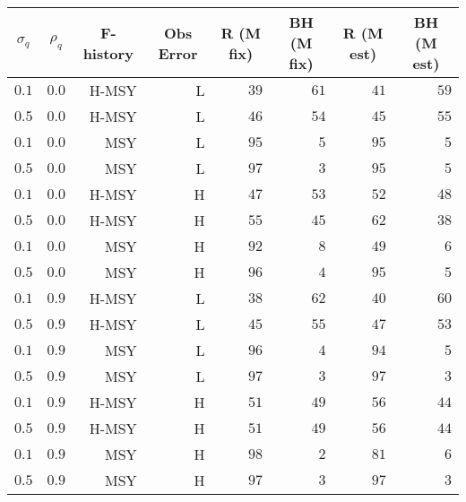 \begin{center}
\begin{tabular}{rrrrrrrr}
\hline\hline
\multicolumn{1}{c}{$\sigma_{q}$}&\multicolumn{1}{c}{$\rho_{q}$}&\multicolumn{1}{c}{F-history}&\multicolumn{1}{c}{Obs Error}&\multicolumn{1}{c}{R (M fix)}&\multicolumn{1}{c}{BH (M fix)}&\multicolumn{1}{c}{R (M est)}&\multicolumn{1}{c}{BH (M est)}\tabularnewline
\hline
$0.1$&$0.0$&H-MSY&L&$39$&$61$&$41$&$59$\tabularnewline
$0.5$&$0.0$&H-MSY&L&$46$&$54$&$45$&$55$\tabularnewline
$0.1$&$0.0$&MSY&L&$95$&$ 5$&$95$&$ 5$\tabularnewline
$0.5$&$0.0$&MSY&L&$97$&$ 3$&$95$&$ 5$\tabularnewline
$0.1$&$0.0$&H-MSY&H&$47$&$53$&$52$&$48$\tabularnewline
$0.5$&$0.0$&H-MSY&H&$55$&$45$&$62$&$38$\tabularnewline
$0.1$&$0.0$&MSY&H&$92$&$ 8$&$49$&$ 6$\tabularnewline
$0.5$&$0.0$&MSY&H&$96$&$ 4$&$95$&$ 5$\tabularnewline
$0.1$&$0.9$&H-MSY&L&$38$&$62$&$40$&$60$\tabularnewline
$0.5$&$0.9$&H-MSY&L&$45$&$55$&$47$&$53$\tabularnewline
$0.1$&$0.9$&MSY&L&$96$&$ 4$&$94$&$ 5$\tabularnewline
$0.5$&$0.9$&MSY&L&$97$&$ 3$&$97$&$ 3$\tabularnewline
$0.1$&$0.9$&H-MSY&H&$51$&$49$&$56$&$44$\tabularnewline
$0.5$&$0.9$&H-MSY&H&$51$&$49$&$56$&$44$\tabularnewline
$0.1$&$0.9$&MSY&H&$98$&$ 2$&$81$&$ 6$\tabularnewline
$0.5$&$0.9$&MSY&H&$97$&$ 3$&$97$&$ 3$\tabularnewline
\hline
\end{tabular}\end{center}
